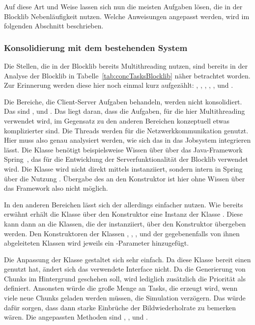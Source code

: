 Auf diese Art und Weise lassen sich nun die meisten Aufgaben lösen, die in der Blocklib Nebenläufigkeit nutzen. Welche Anweisungen angepasst werden, wird im folgenden Abschnitt beschrieben.

\subsubsection{Konsolidierung mit dem bestehenden System}\label{sec:Konsolidierung}

Die Stellen, die in der Blocklib bereits Multithreading nutzen, sind bereits in der Analyse der Blocklib in Tabelle~\vref{tab:concTasksBlocklib} näher betrachtet worden. Zur Erinnerung werden diese hier noch einmal kurz aufgezählt: , , , , ,  und .

Die Bereiche, die Client-Server Aufgaben behandeln, werden nicht konsolidiert. Das sind ,  und . Das liegt daran, dass die Aufgaben, für die hier Multithreading verwendet wird, im Gegensatz zu den anderen Bereichen konzeptuell etwas komplizierter sind. Die Threads werden für die Netzwerkkommunikation genutzt. Hier muss also genau analysiert werden, wie sich das in das Jobsystem integrieren lässt. Die Klasse  benötigt beispielsweise Wissen über über das Java-Framework Spring~\cite{VMware2022}, das für die Entwicklung der Serverfunktionalität der Blocklib verwendet wird. Die Klasse wird nicht direkt mittels  instanziiert, sondern intern in Spring über die Nutzung . Übergabe des  an den Konstruktor ist hier ohne Wissen über das Framework also nicht möglich.

In den anderen Bereichen lässt sich der  allerdings einfacher nutzen. Wie bereits erwähnt erhält die Klasse  über den Konstruktor eine Instanz der Klasse . Diese kann dann an die Klassen, die der  instanziiert, über den Konstruktor übergeben werden. Den Konstruktoren der Klassen , , ,  und der gegebenenfalls von ihnen abgeleiteten Klassen wird jeweils ein -Parameter hinzugefügt.

Die Anpassung der Klasse  gestaltet sich sehr einfach. Da diese Klasse bereit einen  genutzt hat, ändert sich das verwendete Interface nicht. Da die Generierung von Chunks im Hintergrund geschehen soll, wird lediglich zusätzlich die Priorität als  definiert. Ansonsten würde die große Menge an Tasks, die erzeugt wird, wenn viele neue Chunks geladen werden müssen, die Simulation verzögern. Das würde dafür sorgen, dass dann starke Einbrüche der Bildwiederholrate zu bemerken wären. Die angepassten Methoden sind	, ,  und .

